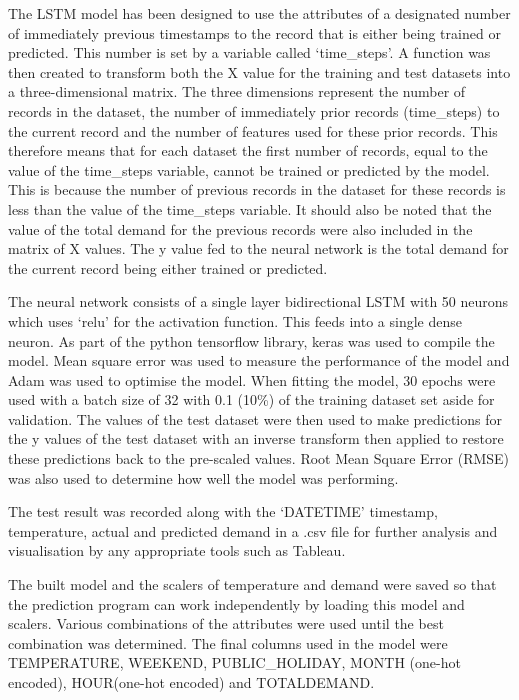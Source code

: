 \documentclass[mstat,12pt]{unswthesis}
\begin{document}
\bigskip

The LSTM model has been designed to use the attributes of a designated
number of immediately previous timestamps to the record that is either
being trained or predicted. This number is set by a variable called
`time\_steps'. A function was then created to transform both the X value
for the training and test datasets into a three-dimensional matrix. The
three dimensions represent the number of records in the dataset, the
number of immediately prior records (time\_steps) to the current record
and the number of features used for these prior records. This therefore
means that for each dataset the first number of records, equal to the
value of the time\_steps variable, cannot be trained or predicted by the
model. This is because the number of previous records in the dataset for
these records is less than the value of the time\_steps variable. It
should also be noted that the value of the total demand for the previous
records were also included in the matrix of X values. The y value fed to
the neural network is the total demand for the current record being
either trained or predicted.

\bigskip

The neural network consists of a single layer bidirectional LSTM with 50
neurons which uses `relu' for the activation function. This feeds into a
single dense neuron. As part of the python tensorflow library, keras was
used to compile the model. Mean square error was used to measure the
performance of the model and Adam was used to optimise the model. When
fitting the model, 30 epochs were used with a batch size of 32 with 0.1
(10\%) of the training dataset set aside for validation. The values of
the test dataset were then used to make predictions for the y values of
the test dataset with an inverse transform then applied to restore these
predictions back to the pre-scaled values. Root Mean Square Error (RMSE)
was also used to determine how well the model was performing.

\bigskip

The test result was recorded along with the `DATETIME' timestamp,
temperature, actual and predicted demand in a .csv file for further
analysis and visualisation by any appropriate tools such as Tableau.

\bigskip

The built model and the scalers of temperature and demand were saved so
that the prediction program can work independently by loading this model
and scalers. Various combinations of the attributes were used until the
best combination was determined. The final columns used in the model
were TEMPERATURE, WEEKEND, PUBLIC\_HOLIDAY, MONTH (one-hot encoded),
HOUR(one-hot encoded) and TOTALDEMAND.
\end{document}
